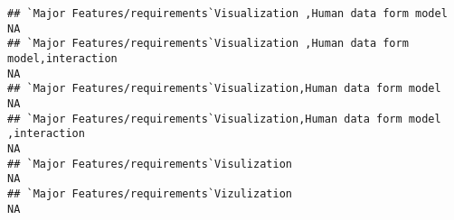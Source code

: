 \documentclass[]{article}
\begin{document}
\begin{verbatim}
## `Major Features/requirements`Visualization ,Human data form model                                                                                                                                                                                                                                                                                                                                                                                                                       NA
## `Major Features/requirements`Visualization ,Human data form model,interaction                                                                                                                                                                                                                                                                                                                                                                                                           NA
## `Major Features/requirements`Visualization,Human data form model                                                                                                                                                                                                                                                                                                                                                                                                                        NA
## `Major Features/requirements`Visualization,Human data form model ,interaction                                                                                                                                                                                                                                                                                                                                                                                                           NA
## `Major Features/requirements`Visulization                                                                                                                                                                                                                                                                                                                                                                                                                                               NA
## `Major Features/requirements`Vizulization                                                                                                                                                                                                                                                                                                                                                                                                                                               NA

\end{verbatim}
\end{document}
